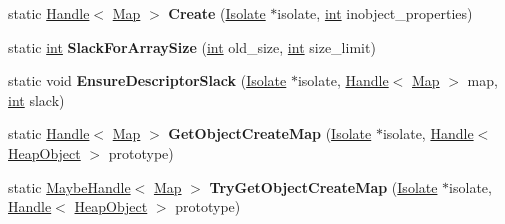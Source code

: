 \begin{DoxyCompactItemize}
\item 
\mbox{\label{classv8_1_1internal_1_1Map_a0190d1c4f6fe4adec7b0719e448d5199}} 
static \mbox{\hyperlink{classv8_1_1internal_1_1Handle}{Handle}}$<$ \mbox{\hyperlink{classv8_1_1internal_1_1Map}{Map}} $>$ {\bfseries Create} (\mbox{\hyperlink{classv8_1_1internal_1_1Isolate}{Isolate}} $\ast$isolate, \mbox{\hyperlink{classint}{int}} inobject\+\_\+properties)
\item 
\mbox{\label{classv8_1_1internal_1_1Map_ad40f689d7c12182e0084c11376c1a1c2}} 
static \mbox{\hyperlink{classint}{int}} {\bfseries Slack\+For\+Array\+Size} (\mbox{\hyperlink{classint}{int}} old\+\_\+size, \mbox{\hyperlink{classint}{int}} size\+\_\+limit)
\item 
\mbox{\label{classv8_1_1internal_1_1Map_a5afe8972d5ae8de250361e18fe420588}} 
static void {\bfseries Ensure\+Descriptor\+Slack} (\mbox{\hyperlink{classv8_1_1internal_1_1Isolate}{Isolate}} $\ast$isolate, \mbox{\hyperlink{classv8_1_1internal_1_1Handle}{Handle}}$<$ \mbox{\hyperlink{classv8_1_1internal_1_1Map}{Map}} $>$ map, \mbox{\hyperlink{classint}{int}} slack)
\item 
\mbox{\label{classv8_1_1internal_1_1Map_a40cfd56d72978694f6618154124ee10f}} 
static \mbox{\hyperlink{classv8_1_1internal_1_1Handle}{Handle}}$<$ \mbox{\hyperlink{classv8_1_1internal_1_1Map}{Map}} $>$ {\bfseries Get\+Object\+Create\+Map} (\mbox{\hyperlink{classv8_1_1internal_1_1Isolate}{Isolate}} $\ast$isolate, \mbox{\hyperlink{classv8_1_1internal_1_1Handle}{Handle}}$<$ \mbox{\hyperlink{classv8_1_1internal_1_1HeapObject}{Heap\+Object}} $>$ prototype)
\item 
\mbox{\label{classv8_1_1internal_1_1Map_a6581d3c9a0d937c488227c2a6776b171}} 
static \mbox{\hyperlink{classv8_1_1internal_1_1MaybeHandle}{Maybe\+Handle}}$<$ \mbox{\hyperlink{classv8_1_1internal_1_1Map}{Map}} $>$ {\bfseries Try\+Get\+Object\+Create\+Map} (\mbox{\hyperlink{classv8_1_1internal_1_1Isolate}{Isolate}} $\ast$isolate, \mbox{\hyperlink{classv8_1_1internal_1_1Handle}{Handle}}$<$ \mbox{\hyperlink{classv8_1_1internal_1_1HeapObject}{Heap\+Object}} $>$ prototype)
\item 
\mbox{\label{classv8_1_1internal_1_1Map_a35401fbfc4fa64f9e0c0e9ecbdaf2c80}} 

\end{DoxyCompactItemize}
